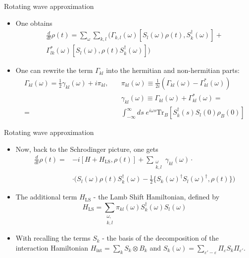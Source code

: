 \documentclass[10pt,xcolor={table,dvipsnames},t]{beamer}
\newcommand{\dt}{\frac{d}{dt}}
\newcommand{\Hint}{H_{\text{int}}}
\begin{document}
\begin{frame}{Rotating wave approximation}
  \begin{itemize}
    \item<1-> One obtains 
      \begin{equation}
        \begin{split}
        \dt \rho(t) =  \sum_\omega \sum_{k,l}\biggl( \Gamma_{k,l}(\omega)[S_l(\omega)\rho(t),S_k^\dag(\omega)]+\\
        \Gamma_{lk}^*(\omega)[S_l(\omega),\rho(t)S_k^\dag(\omega)] \biggr)
        \end{split}
      \end{equation}
    \item<2-> One can rewrite the term $\Gamma_{kl}$ into the hermitian and non-hermitian parts:
      \begin{equation}
        \begin{split}
          \Gamma_{kl}(\omega) = \frac{1}{2} \gamma_{kl}(\omega) + i\pi_{kl}, \quad 
           &\pi_{kl}(\omega) \equiv \frac{1}{2i}(\Gamma_{kl}(\omega)-\Gamma_{kl}^*(\omega))\\
           &\gamma_{kl}(\omega) \equiv \Gamma_{kl}(\omega)+\Gamma_{kl}^*(\omega)= \\
          =& \int_{-\infty}^{\infty}ds\;e^{i\omega s}\text{Tr}_B[S_k^\dag(s)S_l(0)\rho_B(0)]
        \end{split}
      \end{equation}
  \end{itemize}
\end{frame}

\begin{frame}{Rotating wave approximation}
  \begin{itemize}
    \item<1-> Now, back to the Schrodinger picture, one gets
      \begin{equation}
        \begin{split}
          \dt\rho(t) = &-i[H+H_{\text{LS}}, \rho(t)] + 
          \sum_{\substack{\omega \\ k,l}}\gamma_{kl}(\omega) \cdot \\
                       &\cdot \biggl( S_l(\omega)\rho(t)S_k^\dag(\omega) - \frac{1}{2}\biggl\{ S_k(\omega)^\dag
                       S_l(\omega)^\dag,\rho(t) \biggr\} \biggr)
        \end{split}
      \end{equation}
    \item<2-> The additional term $H_\text{LS}$ - the Lamb Shift Hamiltonian, defined by 
      \begin{equation}
        H_{\text{LS}} = \sum_{\substack{\omega, \\k,l}}\pi_{kl}(\omega)S_k^\dag(\omega)S_l(\omega)
      \end{equation}
    \item<2-> With recalling the terms $S_k$ - the basis of the decomposition of the interaction Hamiltonian 
      $\Hint = \sum_k S_k \otimes B_k$ and $S_k(\omega) = \sum_{\varepsilon'-\varepsilon}
      \Pi_{\varepsilon} S_k \Pi_{\varepsilon'}$.
  \end{itemize}
\end{frame}
\end{document}
